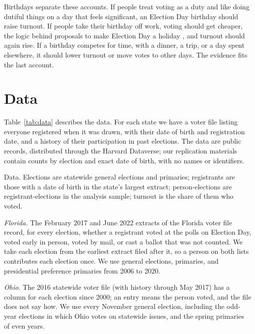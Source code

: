 \documentclass[11pt]{article}
\begin{document}
Birthdays separate these accounts. If people treat voting as a duty and like doing dutiful things on a day that feels significant, an Election Day birthday should raise turnout. If people take their birthday off work, voting should get cheaper, the logic behind proposals to make Election Day a holiday \citep{farber2009democracy}, and turnout should again rise. If a birthday competes for time, with a dinner, a trip, or a day spent elsewhere, it should lower turnout or move votes to other days. The evidence fits the last account.

\section{Data}

Table~\ref{tab:data} describes the data. For each state we have a voter file listing everyone registered when it was drawn, with their date of birth and registration date, and a history of their participation in past elections. The data are public records, distributed through the Harvard Dataverse; our replication materials contain counts by election and exact date of birth, with no names or identifiers.

\begin{table}[htbp]
\centering\TableStyle
\caption{Data. Elections are statewide general elections and primaries; registrants are those with a date of birth in the state's largest extract; person-elections are registrant-elections in the analysis sample; turnout is the share of them who voted.}
\label{tab:data}
\begin{adjustbox}{max width=\textwidth}

\end{adjustbox}
\end{table}

\emph{Florida.} The February 2017 and June 2022 extracts of the Florida voter file record, for every election, whether a registrant voted at the polls on Election Day, voted early in person, voted by mail, or cast a ballot that was not counted. We take each election from the earliest extract filed after it, so a person on both lists contributes each election once. We use general elections, primaries, and presidential preference primaries from 2006 to 2020.

\emph{Ohio.} The 2016 statewide voter file (with history through May 2017) has a column for each election since 2000; an entry means the person voted, and the file does not say how. We use every November general election, including the odd-year elections in which Ohio votes on statewide issues, and the spring primaries of even years.
\end{document}
